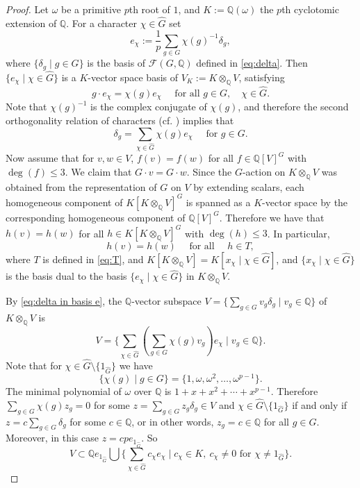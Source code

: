 \documentclass[12pt, oneside]{amsart}
\def\field{K}
\def\QQ{\mathbb{Q}}
\begin{document}
\begin{proof}
Let $\omega$ be a primitive $p$th root of $1$, and $K:=\QQ(\omega)$ the $p$th cyclotomic extension of $\QQ$. 
For a character $\chi\in \widehat G$ set 
\[e_\chi:=\frac 1p\sum_{g\in G}\chi(g)^{-1}\delta_g, \] 
where  $\{\delta_g\mid g\in G\}$ is the basis of $\mathcal{F}(G,\QQ)$ defined in \eqref{eq:delta}.   
Then $\{e_\chi\mid\chi\in \widehat G\}$ is a $\field$-vector space basis of $V_\field:=\field\otimes_\QQ V$, 
satisfying 
\[g\cdot e_\chi=\chi(g)e_\chi \quad \text{ for all }g\in G, \quad \chi\in \widehat G.\] 
Note that $\chi(g)^{-1}$ is the complex conjugate 
of $\chi(g)$, and therefore the second orthogonality relation of characters 
(cf. \cite[Chapter 2, Proposition 7]{serre}) implies that 
\begin{equation}\label{eq:delta in basis e} 
\delta_g=\sum_{\chi\in\widehat G}\chi(g)e_{\chi} \quad \text{ for }g\in G.  
\end{equation}  
Now assume that for $v,w\in V$, $f(v)=f(w)$ for all $f\in \QQ[V]^G$ with 
$\deg(f)\le 3$. We claim that $G\cdot v=G\cdot w$. 
Since the $G$-action on $\field\otimes_\QQ V$ was obtained 
from the representation of $G$ on $V$ by extending scalars, each homogeneous component 
of $\field[\field\otimes_\QQ V]^G$ is spanned as a $\field$-vector space 
by the corresponding homogeneous component of $\QQ[V]^G$. 
Therefore we have that $h(v)=h(w)$ for all $h\in \field[\field\otimes_\QQ V]^G$ with 
$\deg(h)\le 3$. In particular, 
\begin{equation}\label{eq:h(v)=h(w)} 
h(v)=h(w) \quad\text{ for all }\quad h\in T, \end{equation} 
where $T$ is defined in 
\eqref{eq:T}, and $\field[\field\otimes_\QQ V]=\field[x_\chi\mid\chi\in \widehat G]$, 
and $\{x_\chi\mid \chi\in \widehat G\}$ is the basis dual to the basis 
$\{e_\chi\mid \chi\in \widehat G\}$ in $\field\otimes_\QQ V$.   

By \eqref{eq:delta in basis e}, the   $\QQ$-vector subspace $V=\{\sum_{g\in G}v_g\delta_g\mid v_g\in\QQ\}$ of 
$\field\otimes_\QQ V$ is 
\[V=\{\sum_{\chi\in\widehat G}(\sum_{g\in G}\chi(g)v_g)e_\chi\mid v_g\in\QQ\}.\] 
Note that for $\chi\in \widehat G\setminus\{1_{\widehat G}\}$ we have 
\[\{\chi(g)\mid g\in G\}=\{1,\omega,\omega^2,\dots,\omega^{p-1}\}.\] 
The minimal polynomial of $\omega$ over $\QQ$ is $1+x+x^2+\cdots+x^{p-1}$.  
Therefore $\sum_{g\in G}\chi(g)z_g=0$ for some 
$z=\sum_{g\in G}z_g\delta_g\in V$ and $\chi\in \widehat G\setminus\{1_{\widehat G}\}$ if and only if $z=c\sum_{g\in G}\delta_g$ for some $c\in \QQ$, 
or in other words, $z_g=c\in \QQ$ for all $g\in G$. Moreover, in this case $z=cpe_{1_{\widehat G}}$.  
So 
\[V\subset \QQ e_{1_{\widehat G}}\bigcup \{\sum_{\chi\in\widehat G}c_\chi e_\chi
\mid c_\chi\in \field,\ c_\chi\neq 0\text{ for }\chi\neq 1_{\widehat G}\}.\] 



\end{proof}
\end{document}
